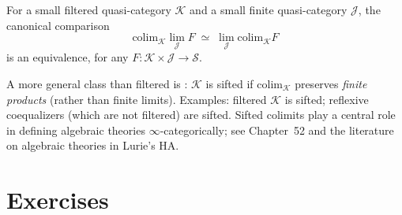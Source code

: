 \begin{theorem}
\label{thm:filtered-finite}
For a small filtered quasi-category $\mathcal{K}$ and a small finite
quasi-category $\mathcal{J}$, the canonical comparison
\begin{equation*}
  \mathrm{colim}_\mathcal{K} \lim_\mathcal{J} F \;\simeq\;
  \lim_\mathcal{J} \mathrm{colim}_\mathcal{K} F
\end{equation*}
is an equivalence, for any $F : \mathcal{K} \times \mathcal{J} \to
\mathcal{S}$.
\end{theorem}

\begin{remark}
A more general class than filtered is : $\mathcal{K}$ is
sifted if $\mathrm{colim}_\mathcal{K}$ preserves \emph{finite products}
(rather than finite limits). Examples: filtered $\mathcal{K}$ is sifted;
reflexive coequalizers (which are not filtered) are sifted. Sifted
colimits play a central role in defining algebraic theories
$\infty$-categorically; see Chapter~52 and the literature on
algebraic theories in Lurie's HA.
\end{remark}


\section{Exercises}
\label{sec:limits-exercises}

